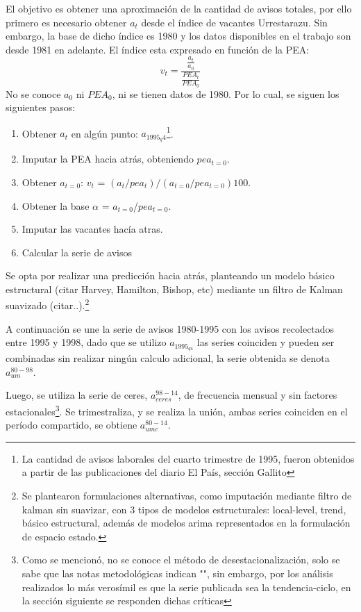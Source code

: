 \documentclass[msc,oneside,a4paper]{udelar} %
\begin{document}
  El objetivo es obtener una aproximación de la cantidad de avisos totales, por ello primero es necesario obtener \(a_t\) desde el índice de vacantes Urrestarazu. Sin embargo, la base de dicho índice es 1980 y los datos disponibles en el trabajo son desde 1981 en adelante. El índice esta expresado en función de la PEA:
  \begin{equation}
  v_t = \frac{\frac{a_t}{a_0}}{\frac{PEA_t}{PEA_0}}
  \end{equation}
  No se conoce \(a_0\) ni \(PEA_0\), ni se tienen datos de 1980. Por lo cual, se siguen los siguientes pasos:
  \begin{enumerate}
  \def\labelenumi{\arabic{enumi}.}
  \tightlist
  \item
    Obtener \(a_t\) en algún punto: \(a_{1995_q4}\)\footnote{La cantidad de avisos laborales del cuarto trimestre de 1995, fueron obtenidos a partir de las publicaciones del diario El País, sección Gallito}.
  \item
    Imputar la PEA hacia atrás, obteniendo \(pea_{t=0}\).
  \item
    Obtener \(a_{t=0}\):
    \(v_t\) = \((a_t/pea_t)/(a_{t=0}/pea_{t=0})100\).
  \item
    Obtener la base \(\alpha\) = \(a_{t=0}\)/\(pea_{t=0}\).
  \item
    Imputar las vacantes hacía atras.
  \item
    Calcular la serie de avisos
  \end{enumerate}
  Se opta por realizar una predicción hacia atrás, planteando un modelo básico estructural (citar Harvey, Hamilton, Bishop, etc) mediante un filtro de Kalman suavizado (citar..).\footnote{Se plantearon formulaciones alternativas, como imputación mediante filtro de kalman sin suavizar, con 3 tipos de modelos estructurales: local-level, trend, básico estructural, además de modelos arima representados en la formulación de espacio estado.}
  
  A continuación se une la serie de avisos 1980-1995 con los avisos recolectados entre 1995 y 1998, dado que se utilizo \(a_{1995_{q4}}\) las series coinciden y pueden ser combinadas sin realizar ningún calculo adicional, la serie obtenida se denota \(a_{um}^{80-98}\).
  
  Luego, se utiliza la serie de ceres, \(a_{ceres}^{98-14}\), de frecuencia mensual y sin factores estacionales\footnote{Como se mencionó, no se conoce el método de desestacionalización, solo se sabe que las notas metodológicas indican "", sin embargo, por los análisis realizados lo más verosímil es que la serie publicada sea la tendencia-ciclo, en la sección siguiente se responden dichas críticas}. Se trimestraliza, y se realiza la unión, ambas series coinciden en el período compartido, se obtiene \(a_{umc}^{80-14}\).
  
\end{document}

